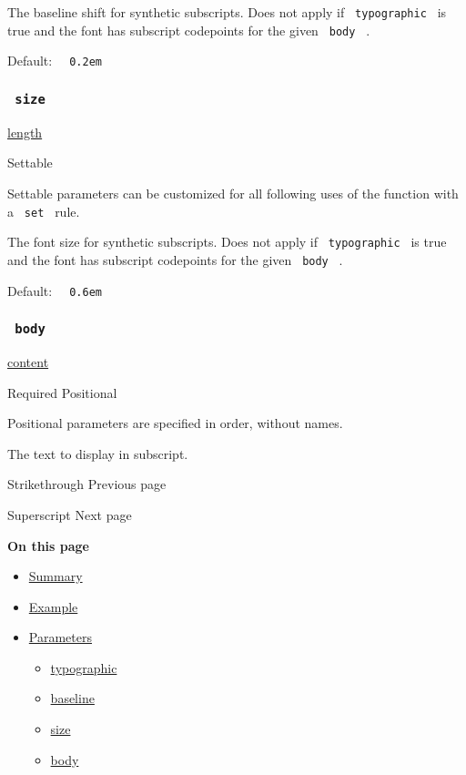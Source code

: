 The baseline shift for synthetic subscripts. Does not apply if
\texttt{\ typographic\ } is true and the font has subscript codepoints
for the given \texttt{\ body\ } .

Default: \texttt{\ }{\texttt{\ 0.2em\ }}\texttt{\ }

\subsubsection{\texorpdfstring{\texttt{\ size\ }}{ size }}\label{parameters-size}

\href{/docs/reference/layout/length/}{length}

{{ Settable }}

\label{parameters-size-settable-tooltip}
Settable parameters can be customized for all following uses of the
function with a \texttt{\ set\ } rule.

The font size for synthetic subscripts. Does not apply if
\texttt{\ typographic\ } is true and the font has subscript codepoints
for the given \texttt{\ body\ } .

Default: \texttt{\ }{\texttt{\ 0.6em\ }}\texttt{\ }

\subsubsection{\texorpdfstring{\texttt{\ body\ }}{ body }}\label{parameters-body}

\href{/docs/reference/foundations/content/}{content}

{Required} {{ Positional }}

\label{parameters-body-positional-tooltip}
Positional parameters are specified in order, without names.

The text to display in subscript.

\href{/docs/reference/text/strike/}{\pandocbounded{}}

{ Strikethrough } { Previous page }

\href{/docs/reference/text/super/}{\pandocbounded{}}

{ Superscript } { Next page }

\textbf{On this page}

\begin{itemize}
\tightlist
\item
  \hyperref[summary]{Summary}
\item
  \hyperref[example]{Example}
\item
  \hyperref[parameters]{Parameters}

  \begin{itemize}
  \tightlist
  \item
    \hyperref[parameters-typographic]{typographic}
  \item
    \hyperref[parameters-baseline]{baseline}
  \item
    \hyperref[parameters-size]{size}
  \item
    \hyperref[parameters-body]{body}
  \end{itemize}
\end{itemize}

